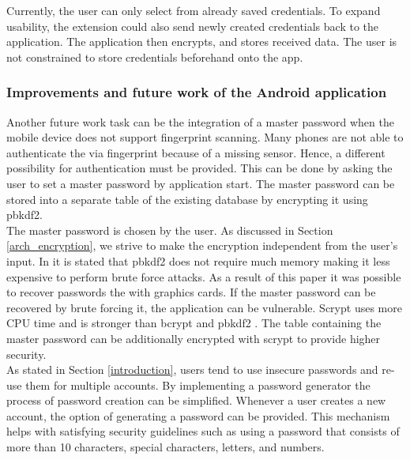 Currently, the user can only select from already saved credentials. To expand usability, the extension could also send newly created credentials back to the application. The application then encrypts, and stores received data. The user is not constrained to store credentials beforehand onto the app. 

\subsubsection*{Improvements and future work of the Android application}
Another future work task can be the integration of a master password when the mobile device does not support fingerprint scanning. Many phones are not able to authenticate the via fingerprint because of a missing sensor. Hence, a different possibility for authentication must be provided. This can be done by asking the user to set a master password by application start. The master password can be stored into a separate table of the existing database by encrypting it using \gls{pbkdf2}. \\
The master password is chosen by the user. As discussed in Section \ref{arch_encryption}, we strive to make the encryption independent from the user's input. In \cite{percival2009stronger} it is stated that \gls{pbkdf2} does not require much memory making it less expensive to perform brute force attacks. As a result of this paper \cite{DBLP:conf/esorics/DurmuthGKPYZ12} it was possible to recover passwords the with graphics cards. If the master password can be recovered by brute forcing it, the application can be vulnerable. Scrypt uses more CPU time and is stronger than bcrypt and \gls{pbkdf2} \cite{percival2009stronger}. The table containing the master password can be additionally encrypted with scrypt to provide higher security. \\

As stated in Section \ref{introduction}, users tend to use insecure passwords and re-use them for multiple accounts. By implementing a password generator the process of password creation can be simplified. Whenever a user creates a new account, the option of generating a password can be provided. This mechanism helps with satisfying security guidelines such as using a password that consists of more than 10 characters, special characters, letters, and numbers.

